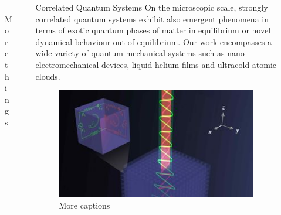 \documentclass[xcolor={table}]{beamer}
\begin{document}
\begin{frame}[fragile=singleslide,t]
\begin{columns}[onlytextwidth,T]
\begin{column}{.47\textwidth}
\begin{figure}
    \centering
    \includegraphics[width=1.\columnwidth, height=0.2\textheight]{complexity.jpg}
    \caption{\footnotesize More things}
\end{figure}

\end{column}

\begin{column}{.47\textwidth}

\begin{block}{Correlated Quantum Systems}
On the microscopic scale, strongly correlated quantum systems exhibit also
emergent phenomena in terms of exotic quantum phases of matter in equilibrium or
novel dynamical behaviour out of equilibrium. Our work encompasses a wide
variety of quantum mechanical systems such as nano-electromechanical devices,
liquid helium films and ultracold atomic clouds.
\end{block}

\begin{figure}
    \includegraphics[width=1\columnwidth, height=0.2\textheight]{correlated.jpg}
    \caption{\footnotesize More captions}
\end{figure}


\end{column}
\end{columns}
\end{frame}
\end{document}
